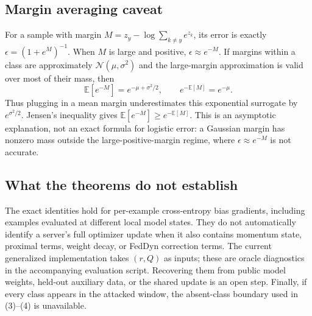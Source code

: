 \documentclass[11pt]{article}
\begin{document}
\subsection{Margin averaging caveat}
For a sample with margin
$M=z_y-\log\sum_{k\ne y}e^{z_k}$, its error is exactly
$\epsilon=(1+e^M)^{-1}$. When $M$ is large and positive,
$\epsilon\approx e^{-M}$. If margins within a class are approximately
$\mathcal N(\mu,\sigma^2)$ and the large-margin approximation is valid over
most of their mass, then
\[
 \mathbb E[e^{-M}]=e^{-\mu+\sigma^2/2},
 \qquad e^{-\mathbb E[M]}=e^{-\mu}.
\]
Thus plugging in a mean margin underestimates this exponential surrogate by
$e^{\sigma^2/2}$. Jensen's inequality gives
$\mathbb E[e^{-M}]\ge e^{-\mathbb E[M]}$. This is an asymptotic explanation,
not an exact formula for logistic error: a Gaussian margin has nonzero mass
outside the large-positive-margin regime, where $\epsilon\approx e^{-M}$ is
not accurate.

\subsection{What the theorems do not establish}
The exact identities hold for per-example cross-entropy bias gradients,
including examples evaluated at different local model states. They do not
automatically identify a server's full optimizer update when it also contains
momentum state, proximal terms, weight decay, or FedDyn correction terms.
The current generalized implementation takes $(r,Q)$ as inputs; these are
oracle diagnostics in the accompanying evaluation script. Recovering them
from public model weights, held-out auxiliary data, or the shared update is
an open step. Finally, if every class appears in the attacked window, the
absent-class boundary used in (3)--(4) is unavailable.
\end{document}
